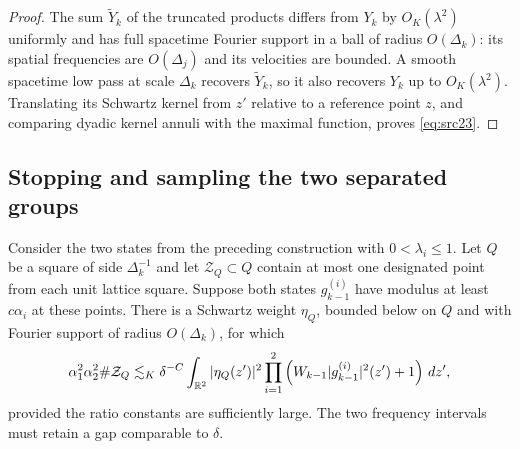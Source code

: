 \begin{proof}
The sum $\widetilde Y_k$ of the truncated products differs from
$Y_k$ by $O_K(\lambda^2)$ uniformly and has full spacetime Fourier
support in a ball of radius $O(\Delta_k)$: its spatial frequencies
are $O(\Delta_j)$ and its velocities are bounded.  A smooth spacetime
low pass at scale $\Delta_k$ recovers $\widetilde Y_k$, so it also
recovers $Y_k$ up to $O_K(\lambda^2)$.  Translating its Schwartz
kernel from $z'$ relative to a reference point $z$, and comparing
dyadic kernel annuli with the maximal function, proves
\eqref{eq:src23}.
\end{proof}

\subsection{Stopping and sampling the two separated groups}

\begin{lemma}
\label{lem:frame-local-bilinear}
Consider the two states from the preceding construction with
$0<\lambda_i\leq1$.
Let $Q$ be a square of side $\Delta_k^{-1}$ and let $\mathcal Z_Q\subset Q$
contain at most one designated point from each unit lattice square.
Suppose both states $g_{k-1}^{(i)}$ have modulus at least
$c\alpha_i$ at these points.  There is a Schwartz weight $\eta_Q$,
bounded below on $Q$ and with Fourier support of radius
$O(\Delta_k)$, for which
\begin{equation}\label{eq:frame-local-sampling}
 \alpha_1^2\alpha_2^2\#\mathcal Z_Q
 \lesssim_K\delta^{-C}\int_{\mathbb R^2}|\eta_Q(z')|^2
 \prod_{i=1}^2\left(W_{k-1}|g_{k-1}^{(i)}|^2(z')+1\right)\,dz',
\end{equation}
provided the ratio constants are sufficiently large.  The two
frequency intervals must retain a gap comparable to $\delta$.
\end{lemma}

